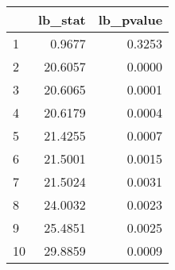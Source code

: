 \begin{tabular}{lrr}
\toprule
{} &  lb\_stat &  lb\_pvalue \\
\midrule
1  &   0.9677 &     0.3253 \\
2  &  20.6057 &     0.0000 \\
3  &  20.6065 &     0.0001 \\
4  &  20.6179 &     0.0004 \\
5  &  21.4255 &     0.0007 \\
6  &  21.5001 &     0.0015 \\
7  &  21.5024 &     0.0031 \\
8  &  24.0032 &     0.0023 \\
9  &  25.4851 &     0.0025 \\
10 &  29.8859 &     0.0009 \\
\bottomrule
\end{tabular}
